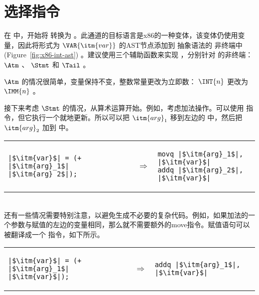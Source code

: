 \documentclass[11pt]{book}
\begin{document}
\section{选择指令}
\label{sec:select-Rvar}

在  中，开始将 \LangCVar{} 转换为 \LangXVar{} 。此通道的目标语言是x86的一种变体，该变体仍使用变量，因此将形式为 $\VAR{\itm{var}}$ 的AST节点添加到 \LangXInt{} 抽象语法的 \Arg{} 非终端中 (Figure~\ref{fig:x86-int-ast}) 。建议使用三个辅助函数来实现  ，分别针对
\LangCVar{} 的非终端： $\Atm$ 、 $\Stmt$ 和 $\Tail$ 。

 $\Atm$ 的情况很简单，变量保持不变，整数常量更改为立即数：
$\INT{n}$ 更改为 $\IMM{n}$ 。

接下来考虑 $\Stmt$ 的情况，从算术运算开始。例如，考虑加法操作。可以使用  指令，但它执行一个就地更新。所以可以把 $\itm{arg}_1$ 移到左边的  中，然后把 $\itm{arg}_2$ 加到  中。\\
\begin{tabular}{lll}
\begin{minipage}{0.4\textwidth}
\begin{lstlisting}
|$\itm{var}$| = (+ |$\itm{arg}_1$| |$\itm{arg}_2$|);
\end{lstlisting}
\end{minipage}
&
$\Rightarrow$
&
\begin{minipage}{0.4\textwidth}
\begin{lstlisting}
movq |$\itm{arg}_1$|, |$\itm{var}$|
addq |$\itm{arg}_2$|, |$\itm{var}$|
\end{lstlisting}
\end{minipage}
\end{tabular} \\
%
还有一些情况需要特别注意，以避免生成不必要的复杂代码。例如，如果加法的一个参数与赋值的左边的变量相同，那么就不需要额外的move指令。赋值语句可以被翻译成一个  指令，如下所示。\\
\begin{tabular}{lll}
\begin{minipage}{0.4\textwidth}
\begin{lstlisting}
|$\itm{var}$| = (+ |$\itm{arg}_1$| |$\itm{var}$|);
\end{lstlisting}
\end{minipage}
&
$\Rightarrow$
&
\begin{minipage}{0.4\textwidth}
\begin{lstlisting}
addq |$\itm{arg}_1$|, |$\itm{var}$|
\end{lstlisting}
\end{minipage}
\end{tabular}
\end{document}
